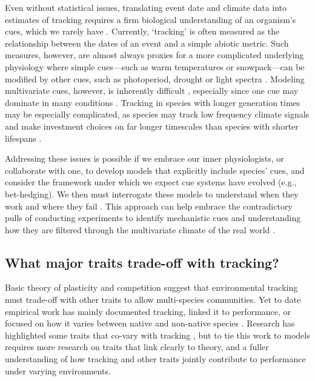 \documentclass[11pt,letterpaper]{article}
\begin{document}
Even without statistical issues, translating event date and climate data into estimates of tracking requires a firm biological understanding of an organism's cues, which we rarely have \citep{chmura2019}. Currently, `tracking' is often measured as the relationship between the dates of an event and a simple abiotic metric. Such measures, however, are almost always proxies for a more complicated underlying physiology where simple cues---such as warm temperatures or snowpack---can be modified by other cues, such as photoperiod, drought or light spectra \citep{Bagnall1993,Stinchcombe:2004ec}. Modeling multivariate cues, however, is inherently difficult \citep{chuine2016}, especially since one cue may dominate in many conditions \citep[and potentially lead many phenological models to fail spectacularly in the future, see][]{chuine2016}. Tracking in species with longer generation times may be especially complicated, as species may track low frequency climate signals and make investment choices on far longer timescales than species with shorter lifespans \citep{morris2008}. 

Addressing these issues is possible if we embrace our inner physiologists, or collaborate with one, to develop models that explicitly include species' cues, and consider the framework under which we expect cue systems have evolved (e.g., bet-hedging). We then must interrogate these models to understand when they work and where they fail \citep[see][for an example]{johanOCR}. This approach can help embrace the contradictory pulls of conducting experiments to identify mechanistic cues and understanding how they are filtered through the multivariate climate of the real world \citep[see][]{Wilczek:2010ad,Wilczek:2009oa}.

\subsection{What major traits trade-off with tracking?} 
Basic theory of plasticity and competition suggest that environmental tracking must trade-off with other traits to allow multi-species communities. Yet to date empirical work has mainly documented tracking, linked it to performance, or focused on how it varies between native and non-native species \citep{Willis:2010al,wolkovichAmBot2013,Zettlemoyer2019}. Research has highlighted some traits that co-vary with tracking \citep[e.g.,][]{kharouba2014,lasky2016,Zhu2016BioLetters}, but to tie this work to models requires more research on traits that link clearly to theory, and a fuller understanding of how tracking and other traits jointly contribute to performance under varying environments. 
\end{document}
